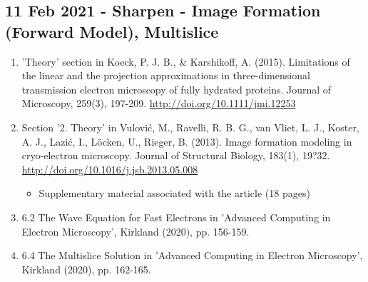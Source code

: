 \documentclass[11pt, oneside]{article}   	%
\begin{document}
\subsection{11 Feb 2021 - Sharpen - Image Formation (Forward Model), Multislice}
\begin{enumerate}
	\item 'Theory' section in Koeck, P. J. B., \& Karshikoff, A. (2015). Limitations of the linear and the projection approximations in three-dimensional transmission electron microscopy of fully hydrated proteins. Journal of Microscopy, 259(3), 197-209. \url{http://doi.org/10.1111/jmi.12253}
	\item Section '2. Theory' in Vulovi\'{c}, M., Ravelli, R. B. G., van Vliet, L. J., Koster, A. J., Lazi\'{c}, I., L\"ocken, U., Rieger, B. (2013). Image formation modeling in cryo-electron microscopy. Journal of Structural Biology, 183(1), 19?32. \url{http://doi.org/10.1016/j.jsb.2013.05.008}
	\begin{itemize}
		\item Supplementary material associated with the article (18 pages)
	\end{itemize}
	\item 6.2 The Wave Equation for Fast Electrons in 'Advanced Computing in Electron Microscopy', Kirkland (2020), pp. 156-159.
	\item 6.4 The Multislice Solution in 'Advanced Computing in Electron Microscopy', Kirkland (2020), pp. 162-165.
\end{enumerate}
\end{document}
